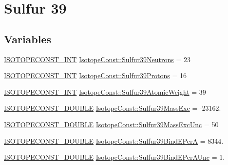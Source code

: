 \hypertarget{group___isotope_const-_sulfur-_s39}{}\section{Sulfur 39}
\label{group___isotope_const-_sulfur-_s39}
\subsection*{Variables}
\begin{DoxyCompactItemize}
\item 
\mbox{\hyperlink{group___isotope_const-_macros_ga5f18360b3e99483a35c32d789e62621c}{I\+S\+O\+T\+O\+P\+E\+C\+O\+N\+S\+T\+\_\+\+I\+NT}} \mbox{\hyperlink{group___isotope_const-_sulfur-_s39_ga07813f548708b2eb423805b65ae85a2b}{Isotope\+Const\+::\+Sulfur39\+Neutrons}} = 23
\item 
\mbox{\hyperlink{group___isotope_const-_macros_ga5f18360b3e99483a35c32d789e62621c}{I\+S\+O\+T\+O\+P\+E\+C\+O\+N\+S\+T\+\_\+\+I\+NT}} \mbox{\hyperlink{group___isotope_const-_sulfur-_s39_ga89adfbc68c4e1c7e1a9392c6270db8e5}{Isotope\+Const\+::\+Sulfur39\+Protons}} = 16
\item 
\mbox{\hyperlink{group___isotope_const-_macros_ga5f18360b3e99483a35c32d789e62621c}{I\+S\+O\+T\+O\+P\+E\+C\+O\+N\+S\+T\+\_\+\+I\+NT}} \mbox{\hyperlink{group___isotope_const-_sulfur-_s39_ga3495adf9048aa1d3ed196f6c96df5384}{Isotope\+Const\+::\+Sulfur39\+Atomic\+Weight}} = 39
\item 
\mbox{\hyperlink{group___isotope_const-_macros_ga8f45a7272ce02c0b4c65c44636ed719a}{I\+S\+O\+T\+O\+P\+E\+C\+O\+N\+S\+T\+\_\+\+D\+O\+U\+B\+LE}} \mbox{\hyperlink{group___isotope_const-_sulfur-_s39_gab747d558c0f3d965ea9f9f13db1b1a91}{Isotope\+Const\+::\+Sulfur39\+Mass\+Exc}} = -\/23162.
\item 
\mbox{\hyperlink{group___isotope_const-_macros_ga8f45a7272ce02c0b4c65c44636ed719a}{I\+S\+O\+T\+O\+P\+E\+C\+O\+N\+S\+T\+\_\+\+D\+O\+U\+B\+LE}} \mbox{\hyperlink{group___isotope_const-_sulfur-_s39_ga0bf32523eb3b49ced4aa54d27b09fbc9}{Isotope\+Const\+::\+Sulfur39\+Mass\+Exc\+Unc}} = 50
\item 
\mbox{\hyperlink{group___isotope_const-_macros_ga8f45a7272ce02c0b4c65c44636ed719a}{I\+S\+O\+T\+O\+P\+E\+C\+O\+N\+S\+T\+\_\+\+D\+O\+U\+B\+LE}} \mbox{\hyperlink{group___isotope_const-_sulfur-_s39_gaa8b2d7bc30533ee6aca1ad24bab4d1c2}{Isotope\+Const\+::\+Sulfur39\+Bind\+E\+PerA}} = 8344.
\item 
\mbox{\hyperlink{group___isotope_const-_macros_ga8f45a7272ce02c0b4c65c44636ed719a}{I\+S\+O\+T\+O\+P\+E\+C\+O\+N\+S\+T\+\_\+\+D\+O\+U\+B\+LE}} \mbox{\hyperlink{group___isotope_const-_sulfur-_s39_gacc1555cddd95456e26b28a15fe8ea0c4}{Isotope\+Const\+::\+Sulfur39\+Bind\+E\+Per\+A\+Unc}} = 1.

\end{DoxyCompactItemize}
